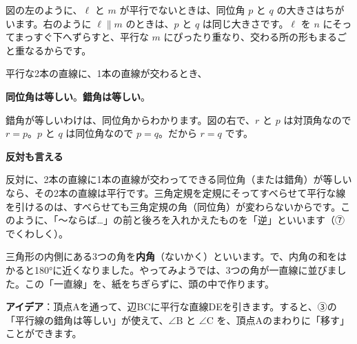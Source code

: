図の左のように、$\ell$ と $m$ が平行でないときは、同位角 $p$ と $q$ の大きさはちがいます。右のように $\ell\parallel m$ のときは、$p$ と $q$ は同じ大きさです。$\ell$ を $n$ にそってまっすぐ下へずらすと、平行な $m$ にぴったり重なり、交わる所の形もまるごと重なるからです。

\begin{taisetsu}
平行な2本の直線に、1本の直線が交わるとき、\par
\quad\textbf{同位角は等しい}。\qquad\textbf{錯角は等しい}。
\end{taisetsu}

錯角が等しいわけは、同位角からわかります。図の右で、$r$ と $p$ は対頂角なので $r=p$。$p$ と $q$ は同位角なので $p=q$。だから $r=q$ です。

\begin{seikaku}
\textbf{反対も言える}\par
反対に、2本の直線に1本の直線が交わってできる同位角（または錯角）が等しいなら、その2本の直線は平行です。三角定規を定規にそってすべらせて平行な線を引けるのは、すべらせても三角定規の角（同位角）が変わらないからです。このように、「〜ならば…」の前と後ろを入れかえたものを「逆」といいます（⑦でくわしく）。
\end{seikaku}


\label{bk:4-1:naikaku}三角形の内側にある3つの角を\textbf{内角}（ないかく）といいます。\bkhatenaref で、内角の和をはかると180°に近くなりました。やってみようでは、3つの角が一直線に並びました。この「一直線」を、紙をちぎらずに、頭の中で作ります。

\textbf{アイデア}：頂点Aを通って、辺BCに平行な直線DEを引きます。すると、③の「平行線の錯角は等しい」が使えて、$\angle\mathrm{B}$ と $\angle\mathrm{C}$ を、頂点Aのまわりに「移す」ことができます。

